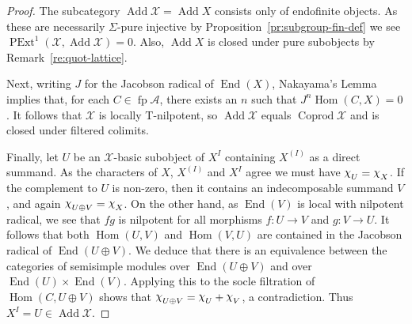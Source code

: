 \documentclass[a4paper]{amsart}
\theoremstyle{plain}
\theoremstyle{definition}
\theoremstyle{remark}
\numberwithin{equation}{section}
\newcommand{\Add}{\operatorname{Add}}
\newcommand{\Coprod}{\operatorname{Coprod}}
\newcommand{\End}{\operatorname{End}}
\newcommand{\fp}{\operatorname{fp}}
\newcommand{\Hom}{\operatorname{Hom}}
\newcommand{\PExt}{\operatorname{PExt}}
\newcommand{\character}{\raisebox{1pt}[0pt][2pt]{$\chi$}}
\def\A{\mathcal A}
\def\X{\mathcal X}
\begin{document}
\begin{proof}
The subcategory $\Add\X=\Add X$ consists only of endofinite objects. As these are necessarily $\Sigma$-pure injective by Proposition~\ref{pr:subgroup-fin-def} we see $\PExt^1(\X,\Add\X)=0$. Also, $\Add X$ is closed under pure subobjects by Remark~\ref{re:quot-lattice}.

Next, writing $J$ for the Jacobson radical of $\End(X)$, Nakayama's Lemma implies that, for each $C\in\fp\A$, there exists an $n$ such that $J^n\Hom(C,X)=0$. It follows that $\X$ is locally T-nilpotent, so $\Add\X$ equals $\Coprod\X$ and is closed under filtered colimits. 

Finally, let $U$ be an $\X$-basic subobject of $X^I$ containing $X^{(I)}$ as a direct summand. As the characters of $X$, $X^{(I)}$ and $X^I$ agree we must have $\character_U=\character_X$. If the complement to $U$ is non-zero, then it contains an indecomposable summand $V$, and again $\character_{U\oplus V}=\character_X$. On the other hand, as $\End(V)$ is local with nilpotent radical, we see that $fg$ is nilpotent for all morphisms $f\colon U\to V$ and $g\colon V\to U$. It follows that both $\Hom(U,V)$ and $\Hom(V,U)$ are contained in the Jacobson radical of $\End(U\oplus V)$. We deduce that there is an equivalence between the categories of semisimple modules over $\End(U\oplus V)$ and over $\End(U)\times\End(V)$. Applying this to the socle filtration of $\Hom(C,U\oplus V)$ shows that $\character_{U\oplus V}=\character_U+\character_V$, a contradiction. Thus $X^I=U\in\Add\X$.
\end{proof}





\end{document}
